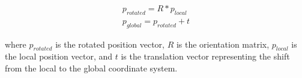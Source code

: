 \begin{equation}
\begin{aligned}
    p_{rotated} = R*p_{local} \\
    p_{global} = p_{rotated} + t
\end{aligned}
\end{equation}

where $p_{rotated}$ is the rotated position vector, $R$ is the orientation matrix, $p_{local}$ is the local position vector, and $t$ is the translation vector representing the shift from the local to the global coordinate system.



\subsubsection{}